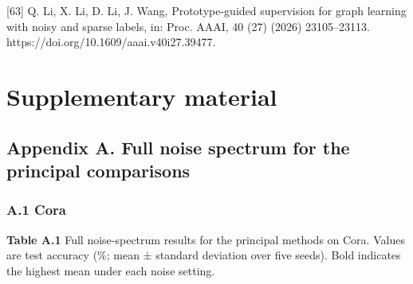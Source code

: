 {[}63{]} Q. Li, X. Li, D. Li, J. Wang, Prototype-guided supervision for graph learning with noisy and sparse labels, in: Proc. AAAI, 40 (27) (2026) 23105--23113. https://doi.org/10.1609/aaai.v40i27.39477.

\section{Supplementary material}\label{supplementary-material}

\subsection{Appendix A. Full noise spectrum for the principal comparisons}\label{appendix-a.-full-noise-spectrum-for-the-principal-comparisons}

\subsubsection{A.1 Cora}\label{a.1-cora}

\textbf{Table A.1} Full noise-spectrum results for the principal methods on Cora. Values are test accuracy (\%; mean ± standard deviation over five seeds). Bold indicates the highest mean under each noise setting.

